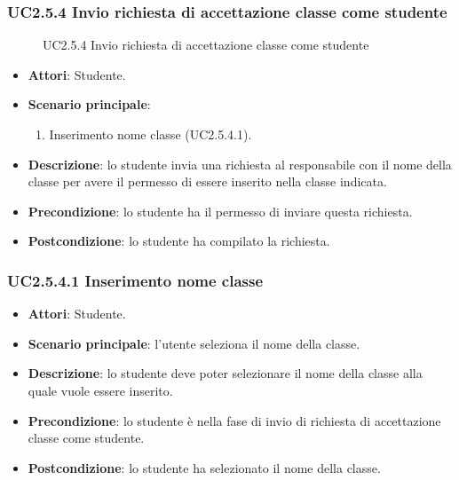\subsubsection{UC2.5.4 Invio richiesta di accettazione classe come studente}
\begin{figure}[H]
\centering
\noindent{}
\caption{UC2.5.4 Invio richiesta di accettazione classe come studente}
\end{figure}
\begin{itemize}
\item \textbf{Attori}: Studente.
\item \textbf{Scenario principale}:
\begin{enumerate}
\item Inserimento nome classe (UC2.5.4.1).
\end{enumerate}
\item \textbf{Descrizione}: lo studente invia una richiesta al responsabile con il nome della classe per avere il permesso di essere inserito nella classe indicata.
\item \textbf{Precondizione}: lo studente ha il permesso di inviare questa richiesta.
\item \textbf{Postcondizione}: lo studente ha compilato la richiesta.
\end{itemize}
\subsubsection{UC2.5.4.1 Inserimento nome classe}
\begin{itemize}
\item \textbf{Attori}: Studente.
\item \textbf{Scenario principale}: l'utente seleziona il nome della classe.
\item \textbf{Descrizione}: lo studente deve poter selezionare il nome della classe alla quale vuole essere inserito.
\item \textbf{Precondizione}: lo studente è nella fase di invio di richiesta di accettazione classe come studente.
\item \textbf{Postcondizione}: lo studente ha selezionato il nome della classe.
\end{itemize}
